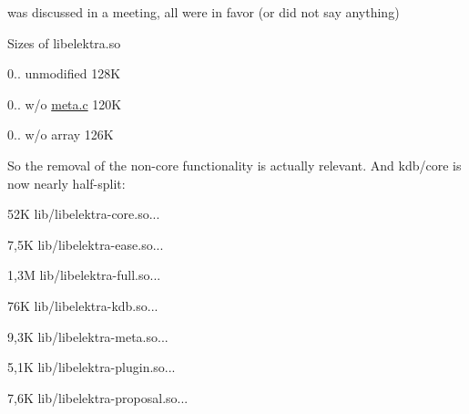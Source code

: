 \begin{DoxyItemize}
\item was discussed in a meeting, all were in favor (or did not say anything)
\end{DoxyItemize}

Sizes of libelektra.\+so


\begin{DoxyItemize}
\item 0.. unmodified 128K
\item 0.. w/o \mbox{\hyperlink{meta_8c}{meta.\+c}} 120K
\item 0.. w/o array 126K
\end{DoxyItemize}

So the removal of the non-\/core functionality is actually relevant. And kdb/core is now nearly half-\/split\+:


\begin{DoxyItemize}
\item 52K lib/libelektra-\/core.\+so...
\item 7,5K lib/libelektra-\/ease.\+so...
\item 1,3M lib/libelektra-\/full.\+so...
\item 76K lib/libelektra-\/kdb.\+so...
\item 9,3K lib/libelektra-\/meta.\+so...
\item 5,1K lib/libelektra-\/plugin.\+so...
\item 7,6K lib/libelektra-\/proposal.\+so... 
\end{DoxyItemize}